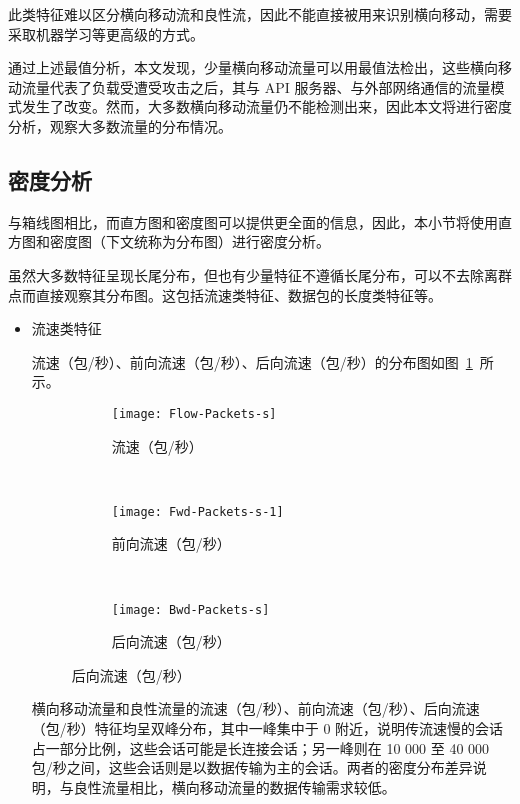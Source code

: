{此类特征难以区分横向移动流和良性流，因此不能直接被用来识别横向移动，需要采取机器学习等更高级的方式。

通过上述最值分析，本文发现，少量横向移动流量可以用最值法检出，这些横向移动流量代表了负载受遭受攻击之后，其与 API 服务器、与外部网络通信的流量模式发生了改变。然而，大多数横向移动流量仍不能检测出来，因此本文将进行密度分析，观察大多数流量的分布情况。

\subsection{密度分析}
\label{sec:distplots}

与箱线图相比，而直方图和密度图可以提供更全面的信息，因此，本小节将使用直方图和密度图（下文统称为分布图）进行密度分析。

虽然大多数特征呈现长尾分布，但也有少量特征不遵循长尾分布，可以不去除离群点而直接观察其分布图。这包括流速类特征、数据包的长度类特征等。

\begin{itemize}
\item {流速类特征

流速（包/秒）、前向流速（包/秒）、后向流速（包/秒）的分布图如图~\ref{fig:flow-rate}~所示。

\begin{figure}[t]
    \centering
    \begin{subfigure}[b]{0.48\textwidth}
      \texttt{[image: Flow-Packets-s]}
      \caption{流速（包/秒）}
    \end{subfigure}
    ~
    \begin{subfigure}[b]{0.48\textwidth}
      \texttt{[image: Fwd-Packets-s-1]}
      \caption{前向流速（包/秒）}
    \end{subfigure}
    \\
    \begin{subfigure}[b]{0.48\textwidth}
      \texttt{[image: Bwd-Packets-s]}
      \caption{后向流速（包/秒）}
    \end{subfigure}
    \label{fig:flow-rate}
\end{figure}

横向移动流量和良性流量的流速（包/秒）、前向流速（包/秒）、后向流速（包/秒）特征均呈双峰分布，其中一峰集中于 0 附近，说明传流速慢的会话占一部分比例，这些会话可能是长连接会话；另一峰则在 10 000 至 40 000 包/秒之间，这些会话则是以数据传输为主的会话。两者的密度分布差异说明，与良性流量相比，横向移动流量的数据传输需求较低。
}


\end{itemize}}

